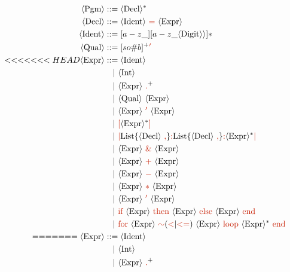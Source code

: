 \documentclass[letterpaper,12pt]{article}
\begin{document}
\newcommand{\nt}[1]{\textcolor{syntax_color}{#1}}
\newcommand{\ntext}[1]{\textcolor{syntax_color}{\text{#1}}}
\newcommand{\term}[1]{\langle \text{#1} \rangle}
\begin{align*}
    \term{Pgm} &::= \langle \text{Decl} \rangle^* \\
    \langle \text{Decl} \rangle &::= \term{Ident} \ \ntext{=} \ \langle \text{Expr} \rangle \\
    \term{Ident} &::= [a-z\_][a-z\_\term{Digit} \rangle]* \\
    \term{Qual} &::= [so\#b]^+\textcolor{syntax_color}{'} \\
<<<<<<< HEAD
        \term{Expr} &::= \langle \text{Ident} \rangle \\
        &\quad | \ \langle \text{Int} \rangle \\
        &\quad | \ \term{Expr} \ \textcolor{syntax_color}{.}^+ \\
        &\quad | \ \term{Qual} \ \term{Expr} \\
        &\quad | \ \term{Expr} \ \nt{'} \ \term{Expr} \\
        &\quad | \ \nt{[} \term{Expr}^* \nt{]} \\
        &\quad | \ \nt{|} \text{List}\lbrace \term{Decl}\ \nt{,}\rbrace\nt{:} \text{List}\lbrace \term{Decl}\ \nt{,}\rbrace \nt{:} \term{Expr}^* \nt{|} \\
        &\quad | \ \term{Expr} \ \nt{\&} \ \term{Expr} \\
        &\quad | \ \term{Expr} \ \nt{+} \ \term{Expr} \\
        &\quad | \ \term{Expr} \ \nt{-} \ \term{Expr} \\
        &\quad | \ \term{Expr} \ \nt{*} \ \term{Expr} \\
        &\quad | \ \term{Expr} \ \nt{'} \ \term{Expr} \\
        &\quad | \ \ntext{\text{if}}\  \term{Expr} \ \ntext{then}\ \term{Expr} \ \ntext{else}\ \term{Expr} \ \ntext{end} \\
        &\quad | \ \textcolor{syntax_color}{\text{for}}\  \term{Expr} \ \textcolor{syntax_color}{\sim}{(\nt{<}|\nt{<=})}\ \term{Expr} \ \textcolor{syntax_color}{\text{loop}}\ \term{Expr}^* \ \ntext{end} \\    
=======
    \term{Expr} &::= \langle \text{Ident} \rangle \\
    &\quad | \ \langle \text{Int} \rangle \\
    &\quad | \ \term{Expr} \ \textcolor{syntax_color}{.}^+ \\

\end{align*}
\end{document}
